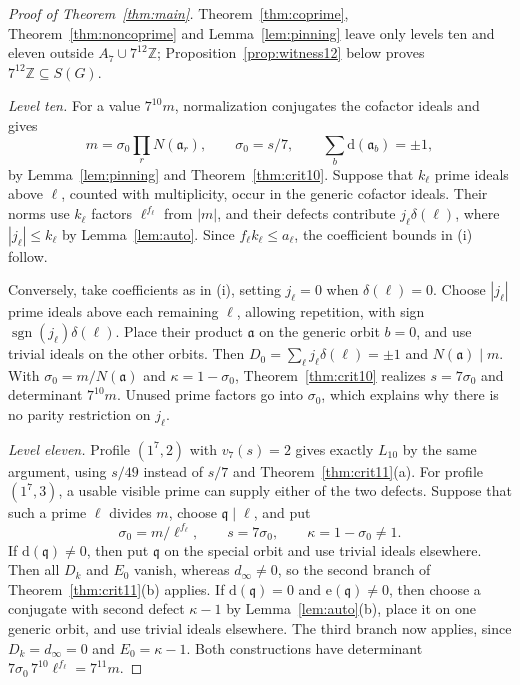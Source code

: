 \documentclass[11pt]{amsart}
\theoremstyle{plain}
\theoremstyle{definition}
\numberwithin{equation}{section}
\newcommand{\Z}{\mathbb Z}
\newcommand{\GG}{G}
\newcommand{\qq}{\mathfrak q}
\newcommand{\dd}{\mathrm d}
\newcommand{\ee}{\mathrm e}
\begin{document}
\begin{proof}[Proof of Theorem~\ref{thm:main}]
Theorem~\ref{thm:coprime}, Theorem~\ref{thm:noncoprime} and
Lemma~\ref{lem:pinning} leave only levels ten and eleven outside
$A_7\cup7^{12}\Z$; Proposition~\ref{prop:witness12} below proves
$7^{12}\Z\subseteq S(\GG)$.

\emph{Level ten.} For a value $7^{10}m$, normalization conjugates
the cofactor ideals and gives
\[
 m=\sigma_0\prod_rN(\mathfrak a_r),\qquad \sigma_0=s/7,
 \qquad \sum_b\dd(\mathfrak a_b)=\pm1,
\]
by Lemma~\ref{lem:pinning} and Theorem~\ref{thm:crit10}.
Suppose that $k_\ell$ prime ideals above $\ell$, counted with
multiplicity, occur in the generic cofactor ideals. Their norms
use $k_\ell$ factors $\ell^{f_\ell}$ from $|m|$, and their defects
contribute
$j_\ell\delta(\ell)$, where $|j_\ell|\le k_\ell$ by
Lemma~\ref{lem:auto}. Since $f_\ell k_\ell\le a_\ell$, the
coefficient bounds in (i) follow.

Conversely, take coefficients as in (i), setting $j_\ell=0$
when $\delta(\ell)=0$. Choose $|j_\ell|$ prime ideals above
each remaining $\ell$, allowing repetition, with sign
$\operatorname{sgn}(j_\ell)\delta(\ell)$. Place their product
$\mathfrak a$ on the generic orbit $b=0$, and use trivial ideals
on the other orbits. Then
$D_0=\sum_\ell j_\ell\delta(\ell)=\pm1$ and
$N(\mathfrak a)\mid m$. With
$\sigma_0=m/N(\mathfrak a)$ and $\kappa=1-\sigma_0$,
Theorem~\ref{thm:crit10} realizes $s=7\sigma_0$ and determinant
$7^{10}m$. Unused prime factors go into $\sigma_0$, which
explains why there is no parity restriction on $j_\ell$.

\emph{Level eleven.} Profile $(1^7,2)$ with $v_7(s)=2$ gives
exactly $L_{10}$ by the same argument, using $s/49$ instead of
$s/7$ and Theorem~\ref{thm:crit11}(a). For profile $(1^7,3)$, a
usable visible prime can supply either of the two defects.
Suppose that such a prime $\ell$ divides $m$, choose $\qq\mid\ell$,
and put
\[
 \sigma_0=m/\ell^{f_\ell},\qquad s=7\sigma_0,\qquad
 \kappa=1-\sigma_0\ne1.
\]
If $\dd(\qq)\ne0$, then put $\qq$ on the special orbit and use
trivial ideals elsewhere. Then all $D_k$ and $E_0$ vanish,
whereas $d_\infty\ne0$, so the second branch of
Theorem~\ref{thm:crit11}(b) applies. If $\dd(\qq)=0$ and
$\ee(\qq)\ne0$, then choose a conjugate with second defect
$\kappa-1$ by Lemma~\ref{lem:auto}(b), place it on one generic
orbit, and use trivial ideals elsewhere. The third branch now
applies, since $D_k=d_\infty=0$ and $E_0=\kappa-1$.
Both constructions have determinant
$7\sigma_0\,7^{10}\ell^{f_\ell}=7^{11}m$.


\end{proof}
\end{document}

